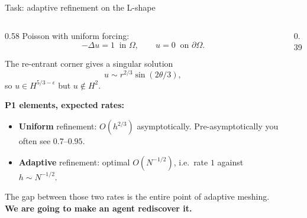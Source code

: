 \documentclass[aspectratio=169,10pt]{beamer}
\newcommand{\hl}[1]{\textcolor{accent}{\textbf{#1}}}
\begin{document}
\begin{frame}{Task: adaptive refinement on the L-shape}
\begin{columns}[T,onlytextwidth]
\begin{column}{0.58\textwidth}
Poisson with uniform forcing:
$$-\Delta u = 1 \ \text{ in } \Omega, \qquad u = 0 \ \text{ on } \partial\Omega.$$

The re-entrant corner gives a singular solution
$$u \sim r^{2/3}\sin(2\theta/3),$$
so $u \in H^{5/3-\epsilon}$ but $u \notin H^2$.

\vspace{0.8em}
\textbf{P1 elements, expected rates:}
\begin{itemize}\itemsep3pt\small
  \item \textbf{Uniform} refinement: $O(h^{2/3})$ asymptotically.
        Pre-asymptotically you often see $0.7$--$0.95$.
  \item \textbf{Adaptive} refinement: optimal $O(N^{-1/2})$, i.e.\ rate $1$
        against $h \sim N^{-1/2}$.
\end{itemize}

\vspace{0.5em}
The gap between those two rates is the entire point of adaptive meshing.
\hl{We are going to make an agent rediscover it.}
\end{column}
\begin{column}{0.39\textwidth}
\begin{center}
\end{center}
\end{column}
\end{columns}
\end{frame}
\end{document}
